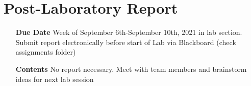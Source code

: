 \section{Post-Laboratory Report}

\begin{itemize}
	\item[\textbf{Due Date}]{Week of September 6th-September 10th, 2021 in lab section. Submit report electronically before start of Lab via Blackboard (check assignments folder)}
	\item[\textbf{Contents}]{No report necessary. Meet with team members and brainstorm ideas for next lab session}
\end{itemize}
